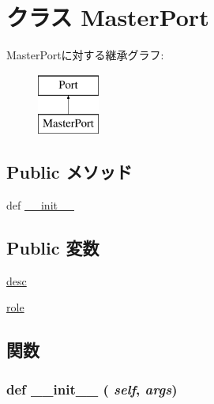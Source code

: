 \hypertarget{classm5_1_1params_1_1MasterPort}{
\section{クラス MasterPort}
\label{classm5_1_1params_1_1MasterPort}
}
MasterPortに対する継承グラフ:\begin{figure}[H]
\begin{center}
\leavevmode
\includegraphics[height=2cm]{classm5_1_1params_1_1MasterPort}
\end{center}
\end{figure}
\subsection*{Public メソッド}
\begin{DoxyCompactItemize}
\item 
def \hyperlink{classm5_1_1params_1_1MasterPort_ac775ee34451fdfa742b318538164070e}{\_\-\_\-init\_\-\_\-}
\end{DoxyCompactItemize}
\subsection*{Public 変数}
\begin{DoxyCompactItemize}
\item 
\hyperlink{classm5_1_1params_1_1MasterPort_aafc566bb08a9f46485e7238669581c2b}{desc}
\item 
\hyperlink{classm5_1_1params_1_1MasterPort_a4e0cdb878325d53ad79a74504bf97a96}{role}
\end{DoxyCompactItemize}


\subsection{関数}
\hypertarget{classm5_1_1params_1_1MasterPort_ac775ee34451fdfa742b318538164070e}{
\subsubsection[{\_\-\_\-init\_\-\_\-}]{\setlength{\rightskip}{0pt plus 5cm}def \_\-\_\-init\_\-\_\- ( {\em self}, \/   {\em args})}}
\label{classm5_1_1params_1_1MasterPort_ac775ee34451fdfa742b318538164070e}



